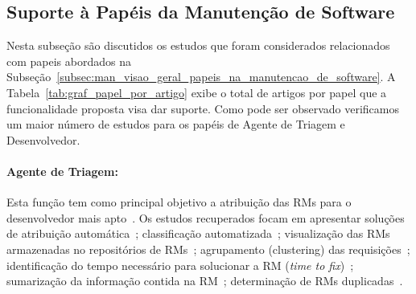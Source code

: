 \subsection{Suporte à Papéis da Manutenção de Software}
\label{sub:extensões_com_suporte_a_papeis}

Nesta subseção são discutidos os estudos que foram considerados relacionados
com papeis abordados na
Subseção~\ref{subsec:man_visao_geral_papeis_na_manutencao_de_software}. A
Tabela~\ref{tab:graf_papel_por_artigo} exibe o total de artigos por papel que a
funcionalidade proposta visa dar suporte.  Como pode ser observado verificamos
um maior número de estudos para os papéis de Agente de Triagem e Desenvolvedor.

\begin{table}[htpb]
\centering
{}
\caption{Total de artigos por papel na manutenção de software}
\label{tab:graf_papel_por_artigo}
\end{table}

\paragraph{Agente de Triagem:}

Esta função tem como principal objetivo a atribuição das RMs para o
desenvolvedor mais apto~\cite{banitaan2013decoba}.  Os estudos recuperados
focam em apresentar soluções de atribuição automática~\cite{banitaan2013decoba,
    shokripour2012automatic, somasundaram2012automatic, Naguib2013, Zhang2014,
    Zanetti2013}; classificação
automatizada~\cite{gegick2010identifying,liu2014faceted, behl2014bug,
    chawla2015automated,tian2015automated}; visualização das RMs armazenadas no
repositórios de RMs~\cite{izquierdo2015gila}; agrupamento (clustering) das
requisições~\cite{liu2014faceted}; identificação do tempo necessário para
solucionar a RM (\textit{time to fix})~\cite{hosseini2012market,
    Bhattacharya:2011:BTP:1985441.1985472}; sumarização da informação contida
na RM~\cite{mani2012ausum}; determinação de RMs duplicadas~\cite{Sun2011,
    Wu2011a}.


